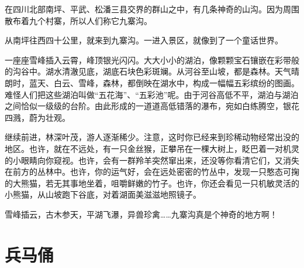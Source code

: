 \documentclass[12pt,UTF-8,openany]{ctexbook}
\begin{document}
\begin{Large}
    
    在四川北部南坪、平武、松潘三县交界的群山之中，有几条神奇的山沟。因为周围散布着九个村寨，所以人们称它九寨沟。
    
    从南坪往西四十公里，就来到九寨沟。一进入景区，就像到了一个童话世界。
    
    一座座雪峰插入云霄，峰顶银光闪闪。大大小小的湖泊，像颗颗宝石镶嵌在彩带般的沟谷中。湖水清澈见底，湖底石块色彩斑斓。从河谷至山坡，都是森林。天气晴朗时，蓝天、白云、雪峰，森林，都倒映在湖水中，构成一幅幅五彩缤纷的图画。难怪人们把这些湖泊叫做“五花海”、“五彩池”呢。由于河谷高低不平，湖泊与湖泊之间恰似一级级的台阶。由此形成的一道道高低错落的瀑布，宛如白练腾空，银花四溅，蔚为壮观。
    
    继续前进，林深叶茂，游人逐渐稀少。注意，这时你已经来到珍稀动物经常出没的地区。也许，就在不远处，有一只金丝猴，正攀吊在一棵大树上，眨巴着一对机灵的小眼睛向你窥视。也许，会有一群羚羊突然窜出来，还没等你看清它们，又消失在前方的丛林中。也许，你的运气好，会在远处密密的竹丛中，发现一只憨态可掬的大熊猫，若无其事地坐着，咀嚼鲜嫩的竹子。也许，你还会看见一只机敏灵活的小熊猫，从山坡跑下谷底，对着湖面美滋滋地照镜子。
    
    雪峰插云，古木参天，平湖飞瀑，异兽珍禽……九寨沟真是个神奇的地方啊！
    
\end{Large}

\chapter{兵马俑}
\end{document}
